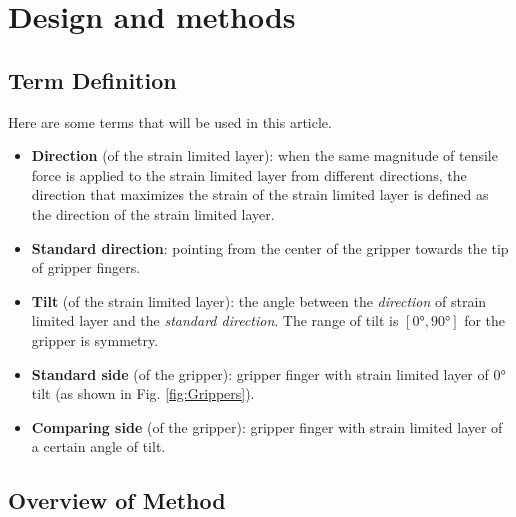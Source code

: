 \documentclass[conference]{IEEEtran}
\begin{document}
\section{Design and methods}


\subsection{Term Definition}
Here are some terms that will be used in this article.
\begin{itemize}
    \item \textbf{Direction} (of the strain limited layer): when the same magnitude of tensile force is applied to the strain limited layer from different directions, the direction that maximizes the strain of the strain limited layer is defined as the direction of the strain limited layer.
    \item \textbf{Standard direction}: pointing from the center of the gripper towards the tip of gripper fingers.
        \item \textbf{Tilt} (of the strain limited layer): the angle between the \textit{direction} of strain limited layer and the \textit{standard direction}. The range of tilt is $[0°,90°]$ for the gripper is symmetry.
    \item \textbf{Standard side} (of the gripper): gripper finger with strain limited layer of 0° tilt (as shown in Fig. \ref{fig:Grippers}).
    \item \textbf{Comparing side} (of the gripper): gripper finger with strain limited layer of a certain angle of tilt.
\end{itemize}

\subsection{Overview of Method}

\end{document}
